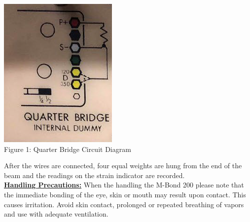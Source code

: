\documentclass{article}
\begin{document}
    \begin{center}
    \includegraphics[scale=0.5]{fig1.png}
    \\Figure 1: Quarter Bridge Circuit Diagram
    \end{center}
    \indent\indent After the wires are connected, four equal weights are hung from the end of the beam and the readings on the strain indicator are recorded. \\
    \textbf{\underline{Handling Precautions:} } When the handling the M-Bond 200 please note that the immediate bonding of the eye, skin or mouth may result upon contact. This causes irritation. Avoid skin contact, prolonged or repeated breathing of vapors and use with adequate ventilation. \\
    \newpage
    
    \newpage
\end{document}
